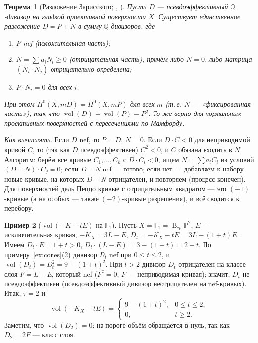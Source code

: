 \documentclass[11pt,a4paper]{article}
\theoremstyle{plain}
\newtheorem{theorem}{Теорема}[section]
\theoremstyle{definition}
\newtheorem{example}[theorem]{Пример}
\theoremstyle{remark}
\newcommand{\Q}{\mathbb{Q}}
\newcommand{\PP}{\mathbb{P}}
\DeclareMathOperator{\Bl}{Bl}
\DeclareMathOperator{\vol}{vol}
\begin{document}
\begin{theorem}[{Разложение Зарисского; \cite[2.3.19]{La}, \cite{Zar}}]\label{thm:Zariski}
Пусть $D$ --- псевдоэффективный $\Q$-дивизор на гладкой проективной поверхности $X$. Существует
единственное разложение $D=P+N$ в сумму $\Q$-дивизоров, где
\begin{enumerate}
\item $P$ nef (\emph{положительная часть});
\item $N=\sum a_iN_i\ge0$ (\emph{отрицательная часть}), причём либо $N=0$, либо матрица
$(N_i\cdot N_j)$ отрицательно определена;
\item $P\cdot N_i=0$ для всех $i$.
\end{enumerate}
При этом $H^0(X,mD)=H^0(X,mP)$ для всех $m$ (т.\,е. $N$ --- «фиксированная часть»), так что
$\vol(D)=\vol(P)=P^2$. То же верно для нормальных проективных поверхностей с пересечениями по
Мамфорду.
\end{theorem}

\emph{Как вычислять.} Если $D$ nef, то $P=D$, $N=0$. Если $D\cdot C<0$ для неприводимой кривой
$C$, то (так как $D$ псевдоэффективен) $C^2<0$, и $C$ обязана входить в $N$. Алгоритм: берём
все кривые $C_1,\dots,C_k$ с $D\cdot C_i<0$, ищем $N=\sum a_iC_i$ из условий $(D-N)\cdot C_j=0$;
если $D-N$ nef --- готово; если нет --- добавляем к набору новые кривые, на которых $D-N$
отрицателен, и повторяем (процесс конечен). Для поверхностей дель Пеццо кривые с отрицательным
квадратом --- это $(-1)$-кривые (а на особых --- также $(-2)$-кривые разрешения), и всё сводится
к перебору.

\begin{example}[$\vol(-K-tE)$ на $\mathbb F_1$]\label{ex:vol-F1}
Пусть $X=\mathbb F_1=\Bl_p\PP^2$, $E$ --- исключительная кривая, $-K_X=3L-E$,
$D_t=-K_X-tE=3L-(1+t)E$. Имеем $D_t\cdot E=1+t>0$, $D_t\cdot(L-E)=3-(1+t)=2-t$. По
примеру~\ref{ex:cones}(2) дивизор $D_t$ nef при $0\le t\le2$, и $\vol(D_t)=D_t^2=9-(1+t)^2$.
При $t>2$ дивизор $D_t$ отрицателен на классе слоя $F=L-E$, который nef ($F^2=0$,
$F$ --- неприводимая кривая); значит, $D_t$ не псевдоэффективен (псевдоэффективный дивизор
неотрицателен на nef-кривых). Итак, $\tau=2$ и
\[
\vol(-K_X-tE)=\begin{cases}9-(1+t)^2,&0\le t\le2,\\0,&t\ge2.\end{cases}
\]
Заметим, что $\vol(D_2)=0$: на пороге объём обращается в нуль, так как $D_2=2F$ --- класс слоя.
\end{example}
\end{document}
